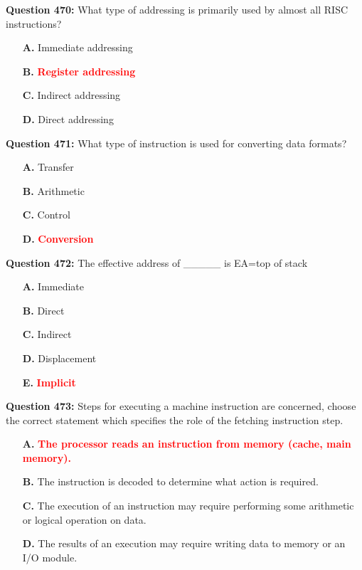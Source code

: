 \documentclass[12pt,a4paper]{article}
\begin{document}
\vspace{0.5cm}

\textbf{Question 470:} What type of addressing is primarily used by almost all RISC instructions?

\begin{itemize}
    \item[\textbf{A.}] Immediate addressing
    \item[\textbf{B.}] \textcolor{red}{\textbf{Register addressing}}
    \item[\textbf{C.}] Indirect addressing
    \item[\textbf{D.}] Direct addressing
\end{itemize}

\vspace{0.5cm}

\textbf{Question 471:} What type of instruction is used for converting data formats?

\begin{itemize}
    \item[\textbf{A.}] Transfer
    \item[\textbf{B.}] Arithmetic
    \item[\textbf{C.}] Control
    \item[\textbf{D.}] \textcolor{red}{\textbf{Conversion}}
\end{itemize}

\vspace{0.5cm}

\textbf{Question 472:} The effective address of _____ is EA=top of stack

\begin{itemize}
    \item[\textbf{A.}] Immediate
    \item[\textbf{B.}] Direct
    \item[\textbf{C.}] Indirect
    \item[\textbf{D.}] Displacement
    \item[\textbf{E.}] \textcolor{red}{\textbf{Implicit}}
\end{itemize}

\vspace{0.5cm}

\textbf{Question 473:} Steps for executing a machine instruction are concerned, choose the correct statement which specifies the role of the fetching instruction step.

\begin{itemize}
    \item[\textbf{A.}] \textcolor{red}{\textbf{The processor reads an instruction from memory (cache, main memory).}}
    \item[\textbf{B.}] The instruction is decoded to determine what action is required.
    \item[\textbf{C.}] The execution of an instruction may require performing some arithmetic or logical operation on data.
    \item[\textbf{D.}] The results of an execution may require writing data to memory or an I/O module.
\end{itemize}
\end{document}
